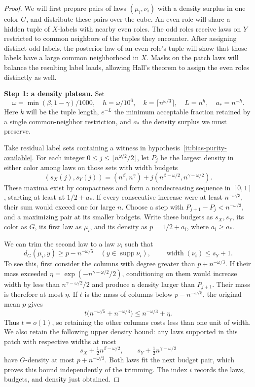 \begin{proof}
We will first prepare pairs of laws \((\mu_i,\nu_i)\) with a density
surplus in one color \(G\), and distribute these pairs over the cube.
An even role will share a hidden tuple of \(X\)-labels with nearby even
roles. The odd roles receive laws on \(Y\) restricted to common neighbors
of the tuples they encounter. After assigning distinct odd labels, the
posterior law of an even role's tuple will show that those labels have a
large common neighborhood in \(X\). Masks on the patch laws will balance
the resulting label loads, allowing Hall's theorem to assign the even
roles distinctly as well.

\noindent\textbf{Step 1: a density plateau.}\quad
Set
\[
 \omega=\min(\beta,1-\gamma)/1000,\quad h=\omega/10^6,\quad
 k=\lceil n^{\omega/3}\rceil,\quad L=n^h,\quad a_*=n^{-h}.
\]
Here \(k\) will be the tuple length, \(e^{-L}\) the minimum acceptable
fraction retained by a single common-neighbor restriction, and \(a_*\)
the density surplus we must preserve.

Take residual label sets containing a witness in
hypothesis~\ref{it:bias-purity-available}. For each integer
\(0\le j\le\lfloor n^{\omega/2}/2\rfloor\), let \(P_j\) be the largest
density in either color among laws on those sets with width budgets
\[
 (s_X(j),s_Y(j))=(n^\beta,n^\gamma)
             +j(n^{\beta-\omega/2},n^{\gamma-\omega/2}).
\]
These maxima exist by compactness and form a nondecreasing sequence in
\([0,1]\), starting at least at \(1/2+a_*\). If every consecutive
increase were at least \(n^{-\omega/3}\), their sum would exceed one
for large \(n\). Choose a step with \(P_{j+1}-P_j<n^{-\omega/3}\),
and a maximizing pair at its smaller budgets. Write these budgets as
\(s_X,s_Y\), its color as \(G\), its first law as \(\mu_i\), and its
density as \(p=1/2+a_i\), where \(a_i\ge a_*\).

We can trim the second law to a law \(\nu_i\) such that
\[
 d_G(\mu_i,y)\ge p-n^{-\omega/5}
       \quad(y\in\operatorname{supp}\nu_i),
 \qquad \operatorname{width}(\nu_i)\le s_Y+1.
\]
To see this, first consider the columns with degree greater than
\(p+n^{-\omega/3}\). If their mass exceeded
\(\eta=\exp(-n^{\gamma-\omega/2}/2)\), conditioning on them would
increase width by less than \(n^{\gamma-\omega/2}/2\) and produce a
density larger than \(P_{j+1}\). Their mass is therefore at most \(\eta\).
If \(t\) is the mass of columns below \(p-n^{-\omega/5}\), the original
mean \(p\) gives
\[
 t\bigl(n^{-\omega/5}+n^{-\omega/3}\bigr)
       \le n^{-\omega/3}+\eta.
\]
Thus \(t=o(1)\), so retaining the other columns costs less than one unit
of width. We also retain the following upper density bound: any laws
supported in this patch with respective widths at most
\[
 s_X+\tfrac12 n^{\beta-\omega/2},\qquad
 s_Y+\tfrac12 n^{\gamma-\omega/2}
\]
have \(G\)-density at most \(p+n^{-\omega/3}\). Both laws fit the next
budget pair, which proves this bound independently of the trimming.
The index \(i\) records the laws, budgets, and density just obtained.


\end{proof}
